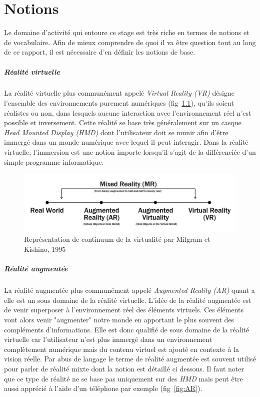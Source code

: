 \newpage
\chapter{Notions}
\label{chap:notions}

Le domaine d'activité qui entoure ce stage est très riche en termes de notions et de vocabulaire. Afin de mieux comprendre de quoi il va être question tout au long de ce rapport, il est nécessaire d'en définir les notions de base.

\paragraph{Réalité virtuelle}
La réalité virtuelle plus communément appelé \emph{Virtual Reality (VR)} désigne l'ensemble des environnements purement numériques (fig~\ref{fig:realityspectrum}), qu'ils soient réalistes ou non, dans lesquels aucune interaction avec l'environnement réel n'est possible et inversement. Cette réalité se base très généralement sur un casque \emph{Head Mounted Display (HMD)} dont l'utilisateur doit se munir afin d'être immergé dans un monde numérique avec lequel il peut interagir. Dans la réalité virtuelle, l'immersion est une notion importe lorsqu'il s'agit de la différenciée d'un simple programme informatique.

\begin{figure}[H]
\centering
\includegraphics[width=\linewidth]{images/RealitySpectrum}
\caption{Représentation de continuum de la virtualité par Milgram et Kishino, 1995\cite{milgram1995augmented}}
\label{fig:realityspectrum}
\end{figure}

\paragraph{Réalité augmentée}
La réalité augmentée plus communément appelé \emph{Augmented Reality (AR)} quant a elle est un sous domaine de la réalité virtuelle. L'idée de la réalité augmentée est de venir superposer à l'environnement réel des éléments virtuels. Ces éléments vont alors venir "augmenter" notre monde en apportant le plus souvent des compléments d'informations. Elle est donc qualifié de sous domaine de la réalité virtuelle car l'utilisateur n'est plus immergé dans un environnement complètement numérique mais du contenu virtuel est ajouté en contexte à la vision réelle. Par abus de langage le terme de réalité augmentée est souvent utilisé pour parler de réalité mixte dont la notion est détaillé ci dessous.
Il faut noter que ce type de réalité ne se base pas uniquement sur des \emph{HMD} mais peut être aussi apprécié à l'aide d'un téléphone par exemple (fig~\ref{fig:AR}).

